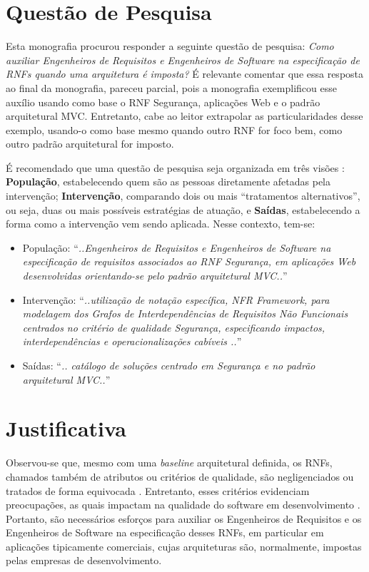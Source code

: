 \section{Questão de Pesquisa}
Esta monografia procurou responder a seguinte questão de pesquisa: \textit{Como auxiliar Engenheiros de Requisitos e Engenheiros de Software na especificação de RNFs quando uma arquitetura é imposta?} É relevante comentar que essa resposta ao final da monografia, pareceu parcial, pois a monografia exemplificou esse auxílio usando como base o RNF Segurança, aplicações Web e o padrão arquitetural MVC. Entretanto, cabe ao leitor extrapolar as particularidades desse exemplo, usando-o como base mesmo quando outro RNF for foco bem, como outro padrão arquitetural for imposto.

É recomendado que uma questão de pesquisa seja organizada em três visões \cite{keele2007guidelines}: 
\textbf{População}, estabelecendo quem são as pessoas diretamente afetadas pela intervenção; \textbf{Intervenção}, comparando dois ou mais “tratamentos alternativos”, ou seja, duas ou mais possíveis estratégias de atuação, e \textbf{Saídas}, estabelecendo a forma como a intervenção vem sendo aplicada. Nesse contexto, tem-se: 

\begin{itemize}
	\item População: “\textit{..Engenheiros de Requisitos e Engenheiros de Software na especificação de requisitos associados ao RNF Segurança, em aplicações Web desenvolvidas orientando-se pelo padrão arquitetural MVC..}”
	\item Intervenção: “\textit{..utilização de notação específica, NFR Framework, para modelagem dos Grafos de Interdependências de Requisitos Não Funcionais centrados no critério de qualidade Segurança, especificando impactos, interdependências e operacionalizações cabíveis  ..}”
	\item Saídas: “\textit{.. catálogo de soluções centrado em Segurança e no padrão arquitetural MVC..}”
\end{itemize}
\section{Justificativa}


Observou-se que, mesmo com uma \textit{baseline}  arquitetural definida, os RNFs, chamados também de atributos ou critérios de qualidade, são negligenciados ou tratados de forma equivocada \cite{eckhardt2016non}. Entretanto, esses critérios evidenciam preocupações, as quais impactam na qualidade do software em desenvolvimento \cite{schneidewind1990standard}.  
Portanto, são necessários esforços para auxiliar os Engenheiros de Requisitos e os Engenheiros de Software na especificação desses RNFs, em particular em aplicações tipicamente comerciais, cujas arquiteturas são, normalmente, impostas pelas empresas de desenvolvimento.

